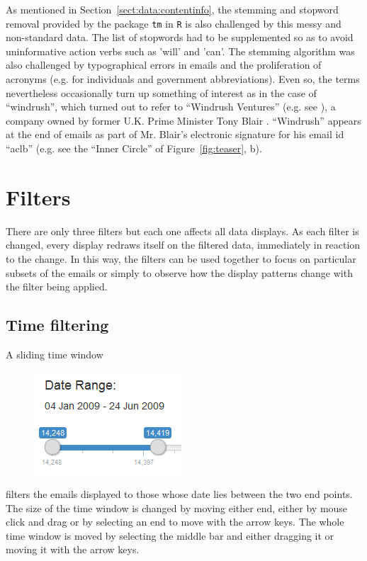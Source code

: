 \documentclass[journal]{vgtc}                %
\begin{document}
As mentioned in Section~\ref{sect:data:contentinfo}, the stemming and stopword removal provided by the package \texttt{tm} in \texttt{R} is also challenged by this messy and non-standard data. The list of stopwords had to be supplemented so as to avoid uninformative action verbs such as 'will' and 'can'. The stemming algorithm was also challenged by typographical errors in emails and the proliferation of acronyms (e.g. for individuals and government abbreviations).   Even so,  the terms nevertheless occasionally turn up something of interest as in the case of ``windrush'',  which turned out to refer to ``Windrush Ventures'' (e.g. see  \cite{windrushTelegraph, windrushGuardian}),  a company owned by former U.K. Prime Minister Tony Blair .  ``Windrush'' appears at the end of emails as part of Mr. Blair's electronic signature for his email id ``aclb''  (e.g. see the ``Inner Circle''  of Figure~\ref{fig:teaser}, b).

\section{Filters}
\label{sect:Filters}
There are only three filters but each one affects all data displays.  As each filter is changed, every display redraws itself on the filtered data, immediately in reaction to the change.  In this way, the filters can be used together to focus on particular subsets of the emails or simply to observe how the display patterns change with the filter being applied.
\subsection{Time filtering}
A sliding time window 
\begin{figure}[h]
\begin{center}
\includegraphics[width=0.35\linewidth]{DateSliderImage}
\end{center}
\end{figure}
filters the emails displayed to those whose date lies between the two end points.
The size of the time window is changed by  moving either end, either by mouse click and drag or by selecting an end to move with the arrow keys. The whole time window is moved by selecting the middle bar and either dragging it or moving it with the arrow keys.
\end{document}
